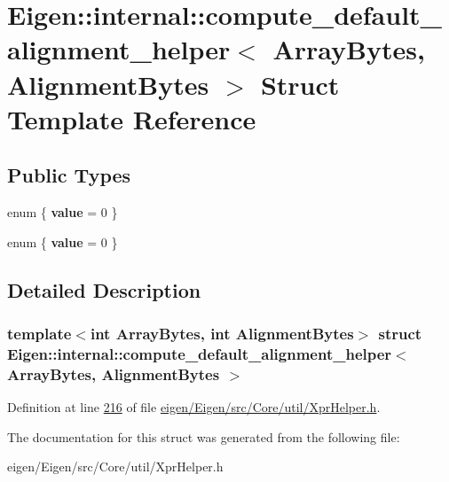 \hypertarget{struct_eigen_1_1internal_1_1compute__default__alignment__helper}{}\section{Eigen\+:\+:internal\+:\+:compute\+\_\+default\+\_\+alignment\+\_\+helper$<$ Array\+Bytes, Alignment\+Bytes $>$ Struct Template Reference}
\label{struct_eigen_1_1internal_1_1compute__default__alignment__helper}
\subsection*{Public Types}
\begin{DoxyCompactItemize}
\item 
\mbox{\label{struct_eigen_1_1internal_1_1compute__default__alignment__helper_a27da697f7d8e61c3387d275b989b2216}} 
enum \{ {\bfseries value} = 0
 \}
\item 
\mbox{\label{struct_eigen_1_1internal_1_1compute__default__alignment__helper_a4cbf90eb337ccdba50f27f5498f670e2}} 
enum \{ {\bfseries value} = 0
 \}
\end{DoxyCompactItemize}


\subsection{Detailed Description}
\subsubsection*{template$<$int Array\+Bytes, int Alignment\+Bytes$>$\newline
struct Eigen\+::internal\+::compute\+\_\+default\+\_\+alignment\+\_\+helper$<$ Array\+Bytes, Alignment\+Bytes $>$}



Definition at line \hyperlink{eigen_2_eigen_2src_2_core_2util_2_xpr_helper_8h_source_l00216}{216} of file \hyperlink{eigen_2_eigen_2src_2_core_2util_2_xpr_helper_8h_source}{eigen/\+Eigen/src/\+Core/util/\+Xpr\+Helper.\+h}.



The documentation for this struct was generated from the following file\+:\begin{DoxyCompactItemize}
\item 
eigen/\+Eigen/src/\+Core/util/\+Xpr\+Helper.\+h\end{DoxyCompactItemize}
